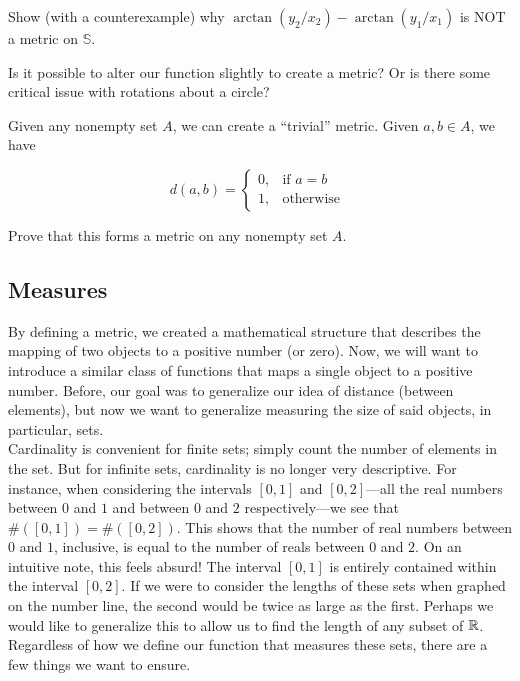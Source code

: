 \begin{exercise}
    Show (with a counterexample) why $\arctan(y_2/x_2)-\arctan(y_1/x_1)$ is NOT a metric on $\mathbb{S}$.
\end{exercise}

\begin{exercise}
    Is it possible to alter our function slightly to create a metric? Or is there some critical issue with rotations about a circle?
\end{exercise}

Given any nonempty set $A$, we can create a ``trivial'' metric. Given $a,b\in A$, we have

\begin{equation}
d(a,b) = 
\left\{
    \begin{array}{lr}
        0, & \text{if } a=b\\
        1, & \text{otherwise }
    \end{array}
\right. 
\end{equation}

\begin{exercise}
    Prove that this forms a metric on any nonempty set $A$.
\end{exercise}

\subsection{Measures}

By defining a metric, we created a mathematical structure that describes the mapping of two objects to a positive number (or zero). Now, we will want to introduce a similar class of functions that maps a single object to a positive number. Before, our goal was to generalize our idea of distance (between elements), but now we want to generalize measuring the size of said objects, in particular, sets. \\

Cardinality is convenient for finite sets; simply count the number of elements in the set. But for infinite sets, cardinality is no longer very descriptive. For instance, when considering the intervals $[0,1]$ and $[0,2]$---all the real numbers between $0$ and $1$ and between $0$ and $2$ respectively---we see that $\#([0,1])=\#([0,2])$. This shows that the number of real numbers between $0$ and $1$, inclusive, is equal to the number of reals between $0$ and $2$. On an intuitive note, this feels absurd! The interval $[0,1]$ is entirely contained within the interval $[0,2]$. If we were to consider the lengths of these sets when graphed on the number line, the second would be twice as large as the first. Perhaps we would like to generalize this to allow us to find the length of any subset of $\mathbb{R}$. Regardless of how we define our function that measures these sets, there are a few things we want to ensure. 

